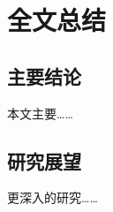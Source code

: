 
\chapter{全文总结}


\section{主要结论}
本文主要\cite{Schinstock2000,Wen1990,Jiang1998,Fang2007,Zhang2012,GBT3792,Xiao2001}……

\section{研究展望}
更深入的研究……


